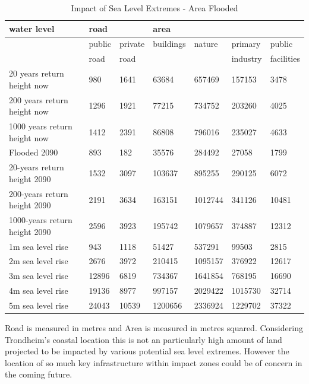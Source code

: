 \begin{table}[h]
    \centering
    \begin{tabular}{|l|l|l|l|l|l|l|}
    \hline
        water level & road & ~ & area  & ~ & ~ & ~ \\ \hline
                ~ & public & private & buildings & nature & primary & public \\ \newline
        ~ & road & road & ~ & ~ & industry &  facilities  \\ \hline
        20 years return height now & 980 & 1641 & 63684 & 657469 & 157153 & 3478 \\ \hline
        200 years return height now & 1296 & 1921 & 77215 & 734752 & 203260 & 4025 \\ \hline
        1000 years return height now & 1412 & 2391 & 86808 & 796016 & 235027 & 4633 \\ \hline
        Flooded 2090 & 893 & 182 & 35576 & 284492 & 27058 & 1799 \\ \hline
        20-years return height 2090 & 1532 & 3097 & 103637 & 895255 & 290125 & 6072 \\ \hline
        200-years return height  2090 & 2191 & 3634 & 163151 & 1012744 & 341126 & 10481 \\ \hline
        1000-years return height  2090 & 2596 & 3923 & 195742 & 1079657 & 374887 & 12312 \\ \hline
        1m sea level rise & 943 & 1118 & 51427 & 537291 & 99503 & 2815 \\ \hline
        2m sea level rise & 2676 & 3972 & 210415 & 1095157 & 376922 & 12617 \\ \hline
        3m sea level rise & 12896 & 6819 & 734367 & 1641854 & 768195 & 16690 \\ \hline
        4m sea level rise & 19136 & 8977 & 997157 & 2029422 & 1015730 & 32714 \\ \hline
        5m sea level rise & 24043 & 10539 & 1200656 & 2336924 & 1229702 & 37322 \\ \hline
    \end{tabular}
    \caption{Impact of Sea Level Extremes - Area Flooded}
    \label{area-impact-sle}
\end{table}

Road is measured in metres and Area is measured in metres squared. Considering Trondheim's coastal location this is not an particularly high amount of land projected to be impacted by various potential sea level extremes. However the location of so much key infrastructure within impact zones could be of concern in the coming future. 

